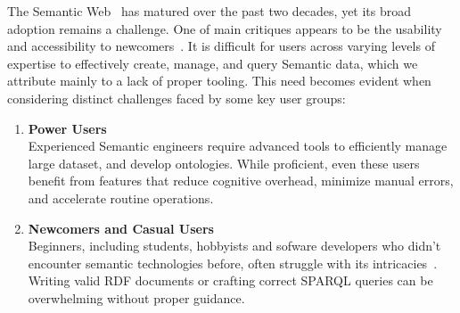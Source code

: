 The Semantic Web~\cite{Berners-Lee_SA_2001} has matured over the past two decades, yet its broad adoption remains a challenge.
One of main critiques appears to be the usability and accessibility to newcomers~\cite{10.3233/SW-190387}.
It is difficult for users across varying levels of expertise to effectively create, manage, and query Semantic data, which we attribute mainly to a lack of proper tooling.
This need becomes evident when considering distinct challenges faced by some key user groups:

\begin{enumerate}
  \item \textbf{Power Users}\\
    Experienced Semantic engineers require advanced tools to efficiently manage large dataset, and develop ontologies.
    While proficient, even these users benefit from features that reduce cognitive overhead, minimize manual errors, and accelerate routine operations.

  \item \textbf{Newcomers and Casual Users}\\
    Beginners, including students, hobbyists and sofware developers who didn't encounter semantic technologies before, often struggle with its intricacies~\cite{EvensteinSigalov2023,Turki2021RepresentingCI}. 
    Writing valid RDF documents or crafting correct SPARQL queries can be overwhelming without proper guidance. 


\end{enumerate}
